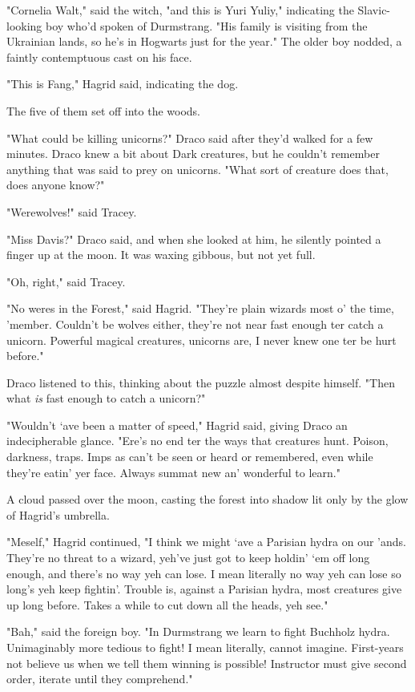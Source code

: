 "Cornelia Walt," said the witch, "and this is Yuri Yuliy," indicating the
Slavic-looking boy who'd spoken of Durmstrang. "His family is visiting from the
Ukrainian lands, so he's in Hogwarts just for the year." The older boy nodded,
a faintly contemptuous cast on his face.

"This is Fang," Hagrid said, indicating the dog.

The five of them set off into the woods.

"What could be killing unicorns?" Draco said after they'd walked for a few
minutes. Draco knew a bit about Dark creatures, but he couldn't remember
anything that was said to prey on unicorns. "What sort of creature does that,
does anyone know?"

"Werewolves!" said Tracey.

"Miss Davis?" Draco said, and when she looked at him, he silently pointed a
finger up at the moon. It was waxing gibbous, but not yet full.

"Oh, right," said Tracey.

"No weres in the Forest," said Hagrid. "They're plain wizards most o' the time,
'member. Couldn't be wolves either, they're not near fast enough ter catch a
unicorn. Powerful magical creatures, unicorns are, I never knew one ter be hurt
before."

Draco listened to this, thinking about the puzzle almost despite himself. "Then
what \emph{is} fast enough to catch a unicorn?"

"Wouldn't `ave been a matter of speed," Hagrid said, giving Draco an
indecipherable glance. "Ere's no end ter the ways that creatures hunt. Poison,
darkness, traps. Imps as can't be seen or heard or remembered, even while
they're eatin' yer face. Always summat new an' wonderful to learn."

A cloud passed over the moon, casting the forest into shadow lit only by the
glow of Hagrid's umbrella.

"Meself," Hagrid continued, "I think we might `ave a Parisian hydra on our
'ands. They're no threat to a wizard, yeh've just got to keep holdin' `em off
long enough, and there's no way yeh can lose. I mean literally no way yeh can
lose so long's yeh keep fightin'. Trouble is, against a Parisian hydra, most
creatures give up long before. Takes a while to cut down all the heads, yeh
see."

"Bah," said the foreign boy. "In Durmstrang we learn to fight Buchholz hydra.
Unimaginably more tedious to fight! I mean literally, cannot imagine.
First-years not believe us when we tell them winning is possible! Instructor
must give second order, iterate until they comprehend."

